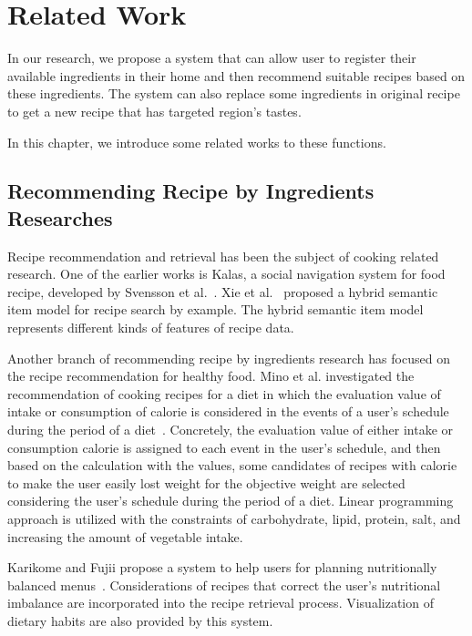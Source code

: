 \chapter{Related Work}\label{chap:related}

In our research, we propose a system that can allow user to register their available ingredients in their home and then recommend suitable recipes based on these ingredients. The system can also replace some ingredients in original recipe to get a new recipe that has targeted region's tastes. 

In this chapter, we introduce some related works to these functions. 

\clearpage

\section{Recommending Recipe by Ingredients Researches}\label{sec:related_near}

Recipe recommendation and retrieval has been the subject of cooking related research. One of the earlier works is Kalas, a social navigation system for food recipe, developed by Svensson et al.~\cite{Svensson:2005:DEK:1096737.1096739}. Xie et al.~\cite{5693849} proposed a hybrid semantic item model for recipe search by example. The hybrid semantic item model represents different kinds of features of recipe data. 

Another branch of recommending recipe by ingredients research has focused on the recipe
recommendation for healthy food. Mino et al. investigated the recommendation of cooking recipes for a diet in which the evaluation value of intake or consumption of calorie is considered in the events of a user's schedule during the period of a diet~\cite{5358168}. Concretely, the evaluation value of either intake or consumption calorie is assigned to each event in the user's schedule, and then based on the calculation with the values, some candidates of recipes with calorie to make the user easily lost weight for the objective weight are selected considering the user's schedule during the period of a diet. Linear programming approach is utilized with the constraints of carbohydrate, lipid, protein, salt, and increasing the amount of vegetable intake. 

Karikome and Fujii propose a system to help users for planning nutritionally balanced menus~\cite{Karikome:2010:SSD:2108616.2108684}. Considerations of recipes that correct the user’s nutritional imbalance are incorporated into the recipe retrieval process. Visualization of dietary habits are also provided by this system.

